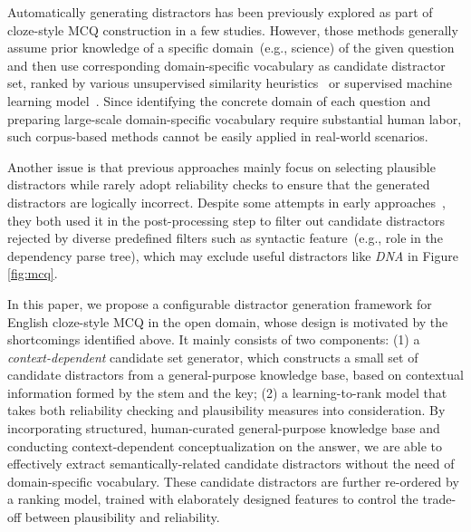 Automatically generating distractors has been previously explored as part of cloze-style MCQ construction in a few studies. However, those methods generally assume prior knowledge of a specific domain~(e.g., science) of 
the given question and then use corresponding domain-specific vocabulary 
as candidate distractor set, ranked by various unsupervised 
similarity heuristics~\cite{sumita2005measuring,Kumar2015RevUP,jiang2017distractor,conceptEmb} or supervised machine learning model~\cite{sakaguchi2013discriminative,welbl2017crowdsourcing,liang2018distractor}.
Since identifying the concrete domain of each question and 
preparing large-scale domain-specific vocabulary require 
substantial human labor, such corpus-based methods cannot be easily 
applied in real-world scenarios.

Another issue is that previous approaches mainly focus on selecting plausible distractors 
while rarely adopt reliability checks to ensure that the generated 
distractors are logically incorrect. 
Despite some attempts in early approaches~\cite{sumita2005measuring,jiang2017distractor}, 
they both used it in the post-processing step to filter out candidate 
distractors rejected by diverse predefined filters such as syntactic feature~(e.g., role in the dependency parse tree), 
which may exclude useful distractors like \textit{DNA} in 
Figure \ref{fig:mcq}.


In this paper, we propose a configurable distractor generation framework for English cloze-style MCQ in the open domain, whose design is motivated by the shortcomings identified above. It mainly consists of two components: 
(1) a \textit{context-dependent} candidate set generator, which constructs a small set of 
candidate distractors from a general-purpose knowledge base, 
based on contextual information formed by the stem and the key; 
(2) a learning-to-rank model that takes both reliability checking and plausibility measures into consideration. By incorporating structured, human-curated
general-purpose knowledge base and conducting context-dependent 
conceptualization on the answer, we are able to effectively extract 
semantically-related candidate distractors without the need of 
domain-specific vocabulary. These candidate distractors are further re-ordered 
by a ranking model, trained with elaborately designed features to control the trade-off between plausibility and reliability.

